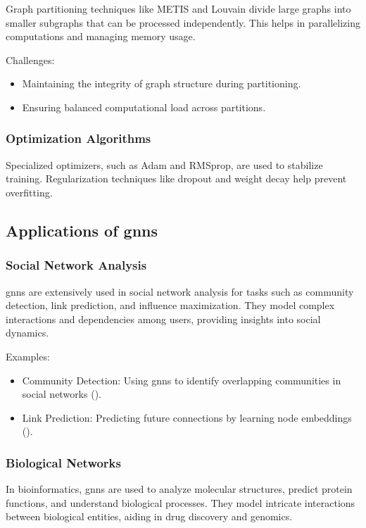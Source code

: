 Graph partitioning techniques like METIS and Louvain divide large graphs into smaller subgraphs that can be processed independently. This helps in parallelizing computations and managing memory usage.

Challenges:
\begin{itemize}
    \item Maintaining the integrity of graph structure during partitioning.
    \item Ensuring balanced computational load across partitions.
\end{itemize}

\subsubsection*{Optimization Algorithms}

Specialized optimizers, such as Adam and RMSprop, are used to stabilize training. Regularization techniques like dropout and weight decay help prevent overfitting.

\subsection*{Applications of \glspl{gnn}}

\subsubsection*{Social Network Analysis}

\glspl{gnn} are extensively used in social network analysis for tasks such as community detection, link prediction, and influence maximization. They model complex interactions and dependencies among users, providing insights into social dynamics.

Examples:
\begin{itemize}
    \item Community Detection: Using \glspl{gnn} to identify overlapping communities in social networks (\cite{Chen2017}).
    \item Link Prediction: Predicting future connections by learning node embeddings (\cite{Zeng2019}).
\end{itemize}


\subsubsection*{Biological Networks}

In bioinformatics, \glspl{gnn} are used to analyze molecular structures, predict protein functions, and understand biological processes. They model intricate interactions between biological entities, aiding in drug discovery and genomics.

